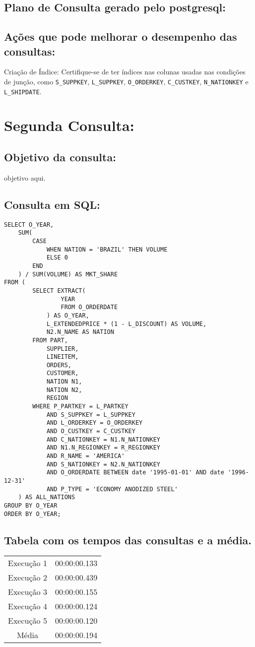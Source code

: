 \documentclass[12pt]{article}
\begin{document}
\begin{landscape}
\subsection{Plano de Consulta gerado pelo postgresql:}

\subsection{Ações que pode melhorar o desempenho das 
consultas:} Criação de Índice: Certifique-se de ter índices nas colunas usadas nas condições de junção, como \texttt{S\_SUPPKEY}, \texttt{L\_SUPPKEY}, \texttt{O\_ORDERKEY}, \texttt{C\_CUSTKEY}, \texttt{N\_NATIONKEY} e \texttt{L\_SHIPDATE}.

\section{Segunda Consulta:}


\subsection{Objetivo da consulta:}
objetivo aqui.
\subsection{Consulta em SQL:}
\begin{lstlisting}
SELECT O_YEAR,
	SUM(
		CASE
			WHEN NATION = 'BRAZIL' THEN VOLUME
			ELSE 0
		END
	) / SUM(VOLUME) AS MKT_SHARE
FROM (
		SELECT EXTRACT(
				YEAR
				FROM O_ORDERDATE
			) AS O_YEAR,
			L_EXTENDEDPRICE * (1 - L_DISCOUNT) AS VOLUME,
			N2.N_NAME AS NATION
		FROM PART,
			SUPPLIER,
			LINEITEM,
			ORDERS,
			CUSTOMER,
			NATION N1,
			NATION N2,
			REGION
		WHERE P_PARTKEY = L_PARTKEY
			AND S_SUPPKEY = L_SUPPKEY
			AND L_ORDERKEY = O_ORDERKEY
			AND O_CUSTKEY = C_CUSTKEY
			AND C_NATIONKEY = N1.N_NATIONKEY
			AND N1.N_REGIONKEY = R_REGIONKEY
			AND R_NAME = 'AMERICA'
			AND S_NATIONKEY = N2.N_NATIONKEY
			AND O_ORDERDATE BETWEEN date '1995-01-01' AND date '1996-12-31'
			AND P_TYPE = 'ECONOMY ANODIZED STEEL'
	) AS ALL_NATIONS
GROUP BY O_YEAR
ORDER BY O_YEAR;
\end{lstlisting}

\subsection{Tabela com os tempos das consultas e a média.}
\begin{tabular}{|c|c|}
  \hline
  Execução 1 & 00:00:00.133 \\
  Execução 2 & 00:00:00.439 \\
  Execução 3 & 00:00:00.155 \\
  Execução 4 & 00:00:00.124 \\
  Execução 5 & 00:00:00.120 \\
  \hline
  Média & 00:00:00.194 \\
  \hline
\end{tabular}


\end{landscape}
\end{document}
